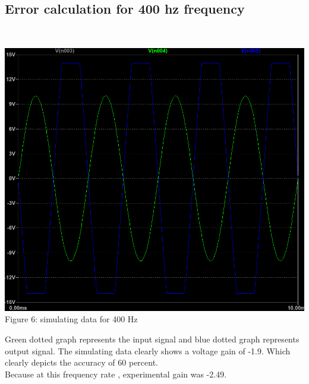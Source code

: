 \documentclass[12pt]{article}
\begin{document}
\subsection{Error calculation for 400 hz frequency}\\
[1cm]
\begin{center}
    \includegraphics[scale=.4]{400hz_lab1.png}\\
    \caption{Figure 6: simulating data for 400 Hz}
\end{center}
Green dotted graph represents the input signal and blue dotted graph represents output signal. The simulating data clearly shows a voltage gain of -1.9. Which clearly depicts the accuracy of 60 percent.\\
Because at this frequency rate , experimental gain was -2.49.\\ 
\end{document}
